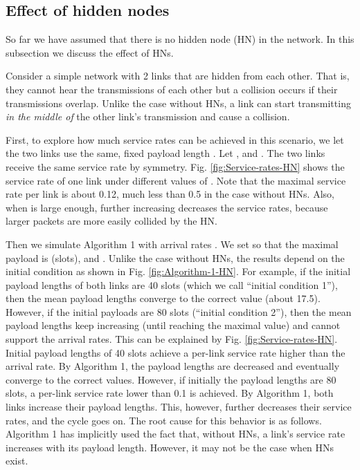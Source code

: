 \documentclass{IEEEtran}
\begin{document}
\subsection{\label{sub:HN}Effect of hidden nodes}

So far we have assumed that there is no hidden node (HN) in the network.
In this subsection we discuss the effect of HNs. 

Consider a simple network with 2 links that are hidden from each other.
That is, they cannot hear the transmissions of each other but a collision
occurs if their transmissions overlap. Unlike the case without HNs,
a link can start transmitting \emph{in the middle of }the other link's
transmission and cause a collision.

First, to explore how much service rates can be achieved in this scenario,
we let the two links use the same, fixed payload length .
Let , and . The two links
receive the same service rate by symmetry. Fig. \ref{fig:Service-rates-HN}
shows the service rate of one link under different values of .
Note that the maximal service rate per link is about 0.12, much less
than 0.5 in the case without HNs. Also, when  is large
enough, further increasing  decreases the service rates,
because larger packets are more easily collided by the HN.

Then we simulate Algorithm 1 with arrival rates .
We set  so that the maximal payload
is  (slots), and .
Unlike the case without HNs, the results depend on the initial condition
as shown in Fig. \ref{fig:Algorithm-1-HN}. For example, if the initial
payload lengths of both links are 40 slots (which we call {}``initial
condition 1''), then the mean payload lengths converge to the correct
value (about 17.5). However, if the initial payloads are 80 slots
({}``initial condition 2''), then the mean payload lengths keep
increasing (until reaching the maximal value) and cannot support the
arrival rates. This can be explained by Fig. \ref{fig:Service-rates-HN}.
Initial payload lengths of 40 slots achieve a per-link service rate
higher than the arrival rate. By Algorithm 1, the payload lengths
are decreased and eventually converge to the correct values. However,
if initially the payload lengths are 80 slots, a per-link service
rate lower than 0.1 is achieved. By Algorithm 1, both links increase
their payload lengths. This, however, further decreases their service
rates, and the cycle goes on. The root cause for this behavior is
as follows. Algorithm 1 has implicitly used the fact that, without
HNs, a link's service rate increases with its payload length. However,
it may not be the case when HNs exist.
\end{document}
